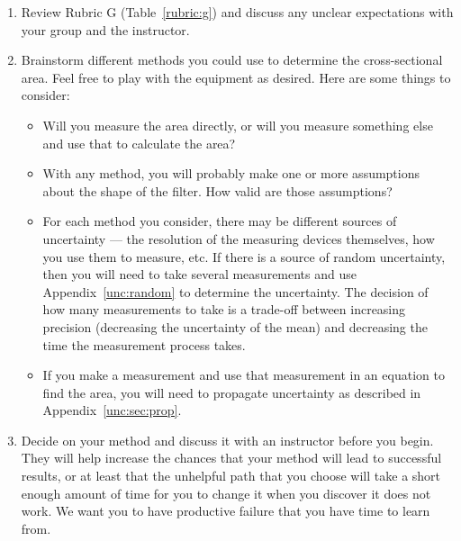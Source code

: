 \begin{enumerate}
	\item Review Rubric G (Table~\ref{rubric:g}) and discuss any unclear expectations with your group and the instructor.
	
	
	\item Brainstorm different methods you could use to determine the cross-sectional area. Feel free to play with the equipment as desired. Here are some things to consider:
	\begin{itemize}
		\item Will you measure the area directly, or will you measure something else and use that to calculate the area?
		
		\item With any method, you will probably make one or more assumptions about the shape of the filter. How valid are those assumptions?
		
		\item For each method you consider, there may be different sources of uncertainty --- the resolution of the measuring devices themselves, how you use them to measure, etc. If there is a source of random uncertainty, then you will need to take several measurements and use Appendix~\ref{unc:random} to determine the uncertainty. The decision of how many measurements to take is a trade-off between increasing precision (decreasing the uncertainty of the mean) and decreasing the time the measurement process takes.
		
		\item If you make a measurement and use that measurement in an equation to find the area, you will need to propagate uncertainty as described in Appendix~\ref{unc:sec:prop}.
	\end{itemize}

	\item Decide on your method and discuss it with an instructor before you begin. They will help increase the chances that your method will lead to successful results, or at least that the unhelpful path that you choose will take a short enough amount of time for you to change it when you discover it does not work. We want you to have productive failure that you have time to learn from.
	

\end{enumerate}
